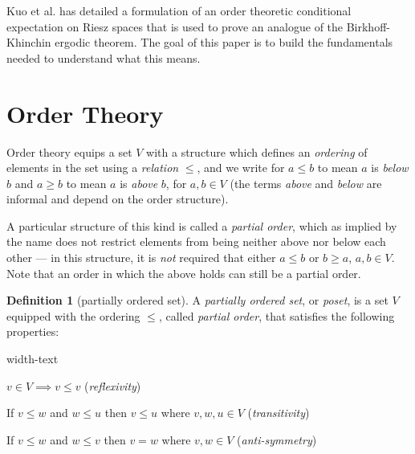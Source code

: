 \documentclass[letterpaper,10pt,oneside,onecolumn,reqno]{amsart}
\theoremstyle{definition}
\newtheorem{defn}{Definition}
\begin{document}
Kuo et al.\cite{Kuo2007422} has detailed a formulation of an order
theoretic conditional expectation on Riesz spaces that is used to
prove an analogue of the Birkhoff-Khinchin ergodic theorem. The goal
of this paper is to build the fundamentals needed to understand what
this means.


\part{Order Theory}

Order theory equips a set $V$ with a structure which defines an
\emph{ordering} of elements in the set using a \emph{relation} $\leq$,
and we write for $a \leq b$ to mean $a$ is \emph{below} $b$ and $a
\geq b$ to mean $a$ is \emph{above} $b$, for $a,b \in V$ (the terms
\emph{above} and \emph{below} are informal and depend on the order
structure).

A particular structure of this kind is called a \emph{partial order},
which as implied by the name does not restrict elements from being
neither above nor below each other --- in this structure, it is
\emph{not} required that either $a \leq b$ or $b \geq a$, $a,b \in
V$. Note that an order in which the above holds can still be a partial
order.

  \begin{defn}[partially ordered set]\label{def:1}
    A \emph{partially ordered set}, or
    \emph{poset}, is a set $V$ equipped with the ordering
    $\leq$, called \emph{partial order}, that satisfies the following
    properties:

    \begin{deflist}{width-text}
    \item $v \in V \implies v \leq v$ (\emph{reflexivity})
    \item If $v \leq w$ and $w \leq u$ then $v \leq u$ where $v,w,u
      \in V$ (\emph{transitivity})
    \item If $v \leq w$ and $w \leq v$ then $v = w$ where $v,w \in V$
      (\emph{anti-symmetry})
    \end{deflist}
  \end{defn}
\end{document}
